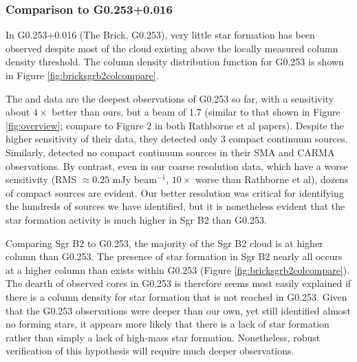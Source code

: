 \documentclass[twocolumn]{aastex61}
\begin{document}

\subsubsection{Comparison to G0.253+0.016}
In G0.253+0.016 (The Brick, G0.253), very little star formation
has been observed
\citep{Longmore2013a,Johnston2014a,Rathborne2014a,Rathborne2015a} despite most
of the cloud existing above the locally measured \citet{Lada2010a} column
density threshold.  The column density distribution function for G0.253
is shown in Figure \ref{fig:bricksgrb2colcompare}.

The \citet{Rathborne2014a} and \citet{Rathborne2015a} data are the deepest
observations of G0.253 so far, with a sensitivity about $4\times$ better than
ours, but a beam of 1.7\arcsec
(similar to that shown in Figure \ref{fig:overview}; compare to Figure 2 in
both Rathborne et al papers).  Despite the higher sensitivity of their data,
they detected only 3 compact continuum sources.  Similarly,
\citet{Kauffmann2013a} detected no compact continuum sources in their SMA and
CARMA observations.  By contrast, even in our coarse resolution data, which
have a worse sensitivity (RMS $\approx 0.25$ mJy beam$^{-1}$, $10\times$ worse
than Rathborne et al), dozens of compact sources are evident.  Our better
resolution was critical for identifying the hundreds of sources we have
identified, but it is nonetheless evident that the star formation activity is
much higher in Sgr B2 than G0.253.


Comparing Sgr B2 to G0.253, the majority of the Sgr B2 cloud is at higher
column than G0.253.  The presence of star formation in Sgr B2 nearly all occurs
at a higher column than exists within G0.253 (Figure
\ref{fig:bricksgrb2colcompare}).  The dearth of observed cores in G0.253 is
therefore seems most easily explained if there is a column density for star
formation that is not reached in G0.253.  Given that the G0.253 observations
were deeper than our own, yet still identified almost no forming stars, it
appears more likely that there is a lack of star formation rather than simply a
lack of high-mass star formation.  Nonetheless, robust verification of this
hypothesis will require much deeper observations.
\end{document}
